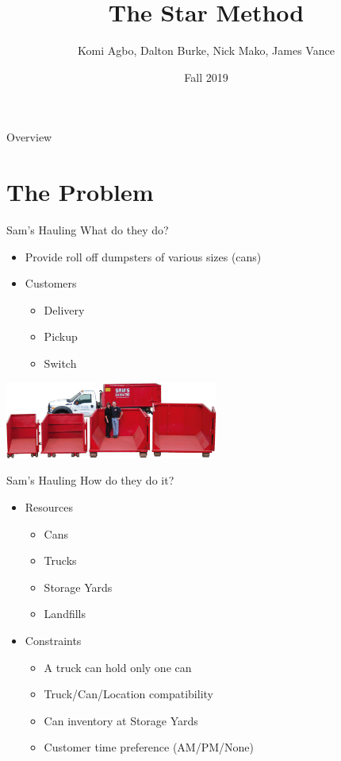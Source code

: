\documentclass{beamer}
\title{The Star Method}
\author[Agbo, Burke, Mako, Vance]{Komi Agbo, Dalton Burke, Nick Mako, James Vance}
\institute[CU Denver]{University of Colorado Denver}
\date{Fall 2019}
\begin{document}
\maketitle

\begin{frame}{Overview}
	\begin{multicols}{2}
	\tableofcontents
	\end{multicols}
\end{frame}

\section{The Problem}
\begin{frame}{Sam's Hauling}
	What do they do?
	\begin{itemize}
		\item Provide roll off dumpsters of various sizes (cans)
		\item Customers 
		\begin{itemize}
			\item Delivery 
			\item Pickup 
			\item Switch 
		\end{itemize}
	\end{itemize}

	\begin{center}
	\includegraphics[width=7cm]{samshauling.jpg}
	\end{center}

\end{frame}
\begin{frame}{Sam's Hauling}
	How do they do it?
	\begin{itemize}
		\item Resources
			\begin{itemize}
				\item Cans
				\item Trucks
				\item Storage Yards
				\item Landfills
			\end{itemize}
		\item Constraints
			\begin{itemize}
				\item A truck can hold only one can
				\item Truck/Can/Location compatibility
				\item Can inventory at Storage Yards
				\item Customer time preference (AM/PM/None)
			\end{itemize}
	\end{itemize}
\end{frame}
\end{document}
